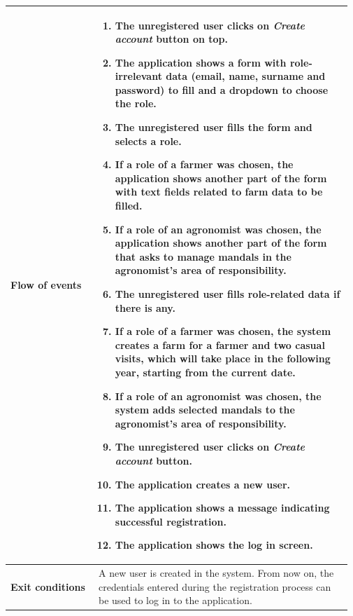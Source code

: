 \begin{table}[H]
\begin{tabular}{@{}p{0.25\linewidth} p{0.72\linewidth}@{}}
		\textbf{Flow of events}     & \begin{enumerate}[leftmargin=.4cm,noitemsep,topsep=0pt,before=\vspace{-3mm},after=\vspace{-4mm}]
		    \item The unregistered user clicks on \textit{Create account} button on top.
		    \item The application shows a form with role-irrelevant data (email, name, surname and password) to fill and a dropdown to choose the role.
		    \item The unregistered user fills the form and selects a role.
		    \item If a role of a farmer was chosen, the application shows another part of the form with text fields related to farm data to be filled.
		    \item If a role of an agronomist was chosen, the application shows another part of the form that asks to manage mandals in the agronomist's area of responsibility.
		    \item The unregistered user fills role-related data if there is any.
		    \item If a role of a farmer was chosen, the system creates a farm for a farmer and two casual visits, which will take place in the following year, starting from the current date.
		    \item If a role of an agronomist was chosen, the system adds selected mandals to the agronomist's area of responsibility.
		    \item The unregistered user clicks on \textit{Create account} button.
		    \item The application creates a new user.
		    \item The application shows a message indicating successful registration.
		    \item The application shows the log in screen.
		\end{enumerate}\\
		\midrule
		\textbf{Exit conditions}    & A new user is created in the system. From now on, the credentials entered during the registration process can be used to log in to the application. \\
		\midrule
		

\end{tabular}
\end{table}
